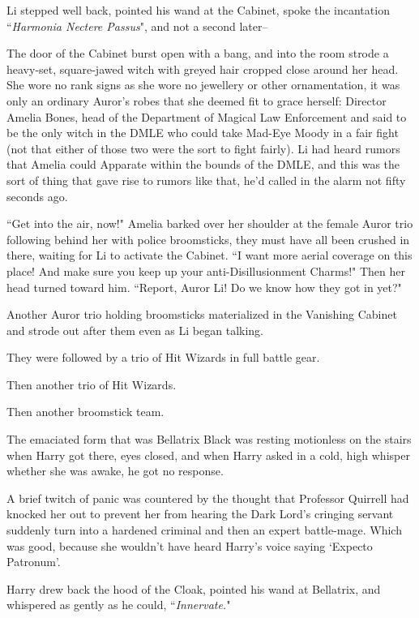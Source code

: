Li stepped well back, pointed his wand at the Cabinet, spoke the incantation ``\emph{Harmonia Nectere Passus}", and not a second later\---

The door of the Cabinet burst open with a bang, and into the room strode a heavy-set, square-jawed witch with greyed hair cropped close around her head. She wore no rank signs as she wore no jewellery or other ornamentation, it was only an ordinary Auror's robes that she deemed fit to grace herself: Director Amelia Bones, head of the Department of Magical Law Enforcement and said to be the only witch in the DMLE who could take Mad-Eye Moody in a fair fight (not that either of those two were the sort to fight fairly). Li had heard rumors that Amelia could Apparate within the bounds of the DMLE, and this was the sort of thing that gave rise to rumors like that, he'd called in the alarm not fifty seconds ago.

``Get into the air, now!" Amelia barked over her shoulder at the female Auror trio following behind her with police broomsticks, they must have all been crushed in there, waiting for Li to activate the Cabinet. ``I want more aerial coverage on this place! And make sure you keep up your anti-Disillusionment Charms!" Then her head turned toward him. ``Report, Auror Li! Do we know how they got in yet?"

Another Auror trio holding broomsticks materialized in the Vanishing Cabinet and strode out after them even as Li began talking.

They were followed by a trio of Hit Wizards in full battle gear.

Then another trio of Hit Wizards.

Then another broomstick team.

\later

The emaciated form that was Bellatrix Black was resting motionless on the stairs when Harry got there, eyes closed, and when Harry asked in a cold, high whisper whether she was awake, he got no response.

A brief twitch of panic was countered by the thought that Professor Quirrell had knocked her out to prevent her from hearing the Dark Lord's cringing servant suddenly turn into a hardened criminal and then an expert battle-mage. Which was good, because she wouldn't have heard Harry's voice saying `Expecto Patronum'.

Harry drew back the hood of the Cloak, pointed his wand at Bellatrix, and whispered as gently as he could, ``\emph{Innervate.}"

